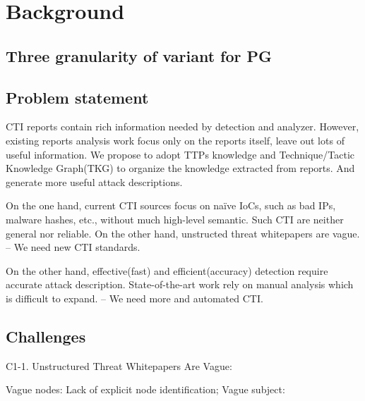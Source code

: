\section{Background}
\label{sec:background}

\subsection{Three granularity of variant for PG}



\cite{Michael2021} \cite{Kurogome2019}

\subsection{Problem statement}

CTI reports contain rich information needed by detection and analyzer. However, existing reports analysis work focus only on the reports itself, leave out lots of useful information. We propose to adopt TTPs knowledge and Technique/Tactic Knowledge Graph(TKG) to organize the knowledge extracted from reports. And generate more useful attack descriptions.

On the one hand, current CTI sources focus on naïve IoCs, such as bad IPs, malware hashes, etc., without much high-level semantic. Such CTI are neither general nor reliable. \cite{Li2019} On the other hand, unstructed threat whitepapers are vague. – We need new CTI standards. 

On the other hand, effective(fast) and efficient(accuracy) detection require accurate attack description. State-of-the-art work rely on manual analysis \cite{Milajerdi2019} which is difficult to expand. – We need more and automated CTI. 

\subsection{Challenges}


C1-1. Unstructured Threat Whitepapers Are Vague: 

Vague nodes: Lack of explicit node identification; Vague subject: 

